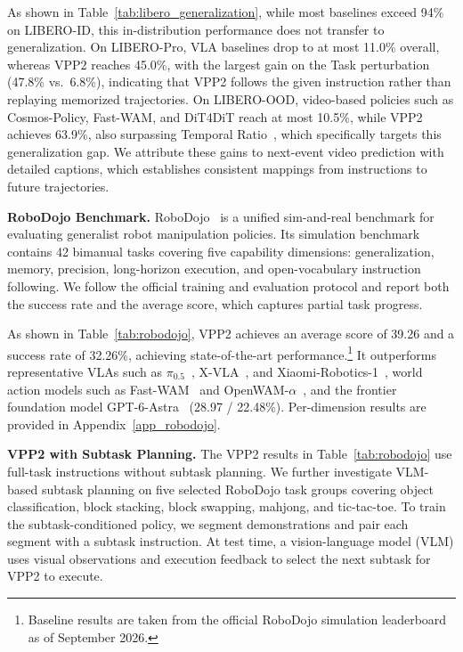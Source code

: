 As shown in Table~\ref{tab:libero_generalization}, while most baselines exceed 94\% on LIBERO-ID, this in-distribution performance does not transfer to generalization. On LIBERO-Pro, VLA baselines drop to at most 11.0\% overall, whereas VPP2 reaches 45.0\%, with the largest gain on the Task perturbation (47.8\% vs.\ 6.8\%), indicating that VPP2 follows the given instruction rather than replaying memorized trajectories. On LIBERO-OOD, video-based policies such as Cosmos-Policy, Fast-WAM, and DiT4DiT reach at most 10.5\%, while VPP2 achieves 63.9\%, also surpassing Temporal Ratio~\citep{mishra2026understanding}, which specifically targets this generalization gap. We attribute these gains to next-event video prediction with detailed captions, which establishes consistent mappings from instructions to future trajectories.

\textbf{RoboDojo Benchmark.}
RoboDojo~\citep{chen2026robodojo} is a unified sim-and-real benchmark for evaluating generalist robot manipulation policies. Its simulation benchmark contains 42 bimanual tasks covering five capability dimensions: generalization, memory, precision, long-horizon execution, and open-vocabulary instruction following. We follow the official training and evaluation protocol and report both the success rate and the average score, which captures partial task progress.

As shown in Table~\ref{tab:robodojo}, VPP2 achieves an average score of 39.26 and a success rate of 32.26\%, achieving state-of-the-art performance.\footnote{Baseline results are taken from the official RoboDojo simulation leaderboard as of September 2026.} It outperforms representative VLAs such as $\pi_{0.5}$~\citep{intelligence2025pi_}, X-VLA~\citep{zheng2026xvla}, and Xiaomi-Robotics-1~\citep{guo2026xiaomirobotics1}, world action models such as Fast-WAM~\citep{yuan2026fastwam} and OpenWAM-$\alpha$~\citep{wang2026openwam}, and the frontier foundation model GPT-6-Astra~\citep{zhang2026astra} (28.97 / 22.48\%). Per-dimension results are provided in Appendix~\ref{app_robodojo}.



\textbf{VPP2 with Subtask Planning.}
The VPP2 results in Table~\ref{tab:robodojo} use full-task instructions without subtask planning. We further investigate VLM-based subtask planning on five selected RoboDojo task groups covering object classification, block stacking, block swapping, mahjong, and tic-tac-toe. To train the subtask-conditioned policy, we segment demonstrations and pair each segment with a subtask instruction. At test time, a vision-language model (VLM) uses visual observations and execution feedback to select the next subtask for VPP2 to execute.


